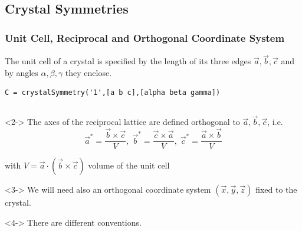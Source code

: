 \documentclass[compress]{beamer}
\begin{document}
\subsection*{Crystal Symmetries}
\label{sec:crystal-symmetries}

\begin{frame}[fragile]
  \frametitle{Unit Cell, Reciprocal and Orthogonal Coordinate System}

  \begin{overlayarea}{\textwidth}{8cm}
    The unit cell of a crystal is specified by the length of its three edges
    $\vec a, \vec b, \vec c$ and by angles $\alpha, \beta, \gamma$ they enclose.

  \begin{lstlisting}[style=input]
C = crystalSymmetry('1',[a b c],[alpha beta gamma])
  \end{lstlisting}

  \begin{columns}
    \begin{column}{7.5cm}

      \begin{uncoverenv}<2->
        The axes of the reciprocal lattice are defined
        orthogonal to $\vec a, \vec b, \vec c$, i.e.
\vspace{-0.2cm}
\begin{equation*}
  \vec a^{*} = \frac{\vec b \times \vec c}{V}, \;
  \vec b^{*} = \frac{\vec c \times \vec a}{V}, \;
  \vec c^{*} = \frac{\vec a \times \vec b}{V}
\end{equation*}

\vspace{-0.4cm}

with  $V = \vec a \cdot (\vec b \times \vec c)$  volume of the unit cell
      \end{uncoverenv}

      \medskip

      \begin{uncoverenv}<3->
        We will need also an orthogonal coordinate system $(\vec x, \vec y,
        \vec z)$ fixed to the crystal.
      \end{uncoverenv}

      \medskip

      \begin{uncoverenv}<4->
        \alert{There are different conventions.}
      \end{uncoverenv}

  \end{column}


\end{columns}
\end{overlayarea}
\end{frame}
\end{document}

